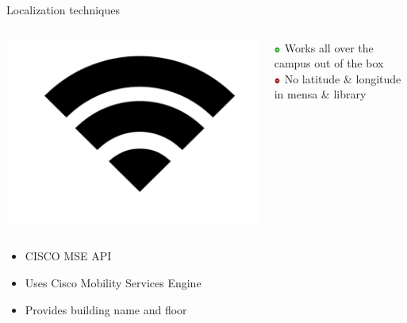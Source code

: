 \documentclass[11pt]{beamer}
\begin{document}
\begin{frame}[t]{Localization techniques}

  \begin{columns}[c]

    \begin{column}{0.2\textwidth}
      \includegraphics[width=\textwidth]{wifi-symbol}
    \end{column}

    \hfill

    \begin{column}{0.8\textwidth}

      \includegraphics[width=0.05\textwidth]{plus} Works all over the campus out of the box\\
      \includegraphics[width=0.05\textwidth]{minus} No latitude \& longitude in mensa \& library

    \end{column}

  \end{columns}

  \begin{itemize}
    \setlength{\itemsep}{1pt}
    \setlength{\parskip}{0pt}
    \setlength{\parsep}{0pt}
    \item CISCO MSE API
    \item Uses Cisco Mobility Services Engine
    \item Provides building name and floor
  \end{itemize}
  \vfill
\end{frame}
\end{document}
